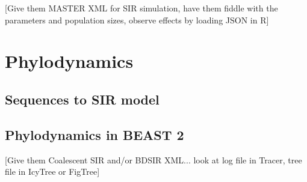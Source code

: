 \documentclass{scrartcl}
\begin{document}
[Give them MASTER XML for SIR simulation, have them fiddle with the parameters and population sizes, observe effects by loading JSON in R]

\section{Phylodynamics}

\subsection{Sequences to SIR model}

\subsection{Phylodynamics in BEAST 2}

[Give them Coalescent SIR and/or BDSIR XML... look at log file in Tracer, tree file in IcyTree or FigTree]

\newpage
\begin{thebibliography}{99} %

 
\end{thebibliography}

\end{document}
